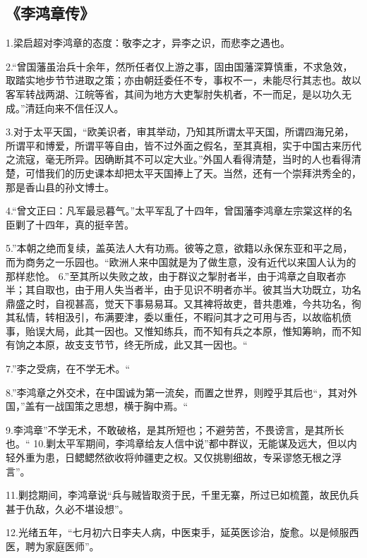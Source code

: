 \subsection{《李鸿章传》}

1.梁启超对李鸿章的态度：敬李之才，异李之识，而悲李之遇也。

2.“曾国藩虽治兵十余年，然所任者仅上游之事，固由国藩深算慎重，不求急效，取踏实地步节节进取之策；亦由朝廷委任不专，事权不一，未能尽行其志也。故以客军转战两湖、江皖等省，其间为地方大吏掣肘失机者，不一而足，是以功久无成。”清廷向来不信任汉人。

3.对于太平天国，“欧美识者，审其举动，乃知其所谓太平天国，所谓四海兄弟，所谓平和博爱，所谓平等自由，皆不过外面之假名，至其真相，实于中国古来历代之流寇，毫无所异。因确断其不可以定大业。”外国人看得清楚，当时的人也看得清楚，可惜我们的历史课本却把太平天国捧上了天。当然，还有一个崇拜洪秀全的，那是香山县的孙文博士。

4.“曾文正曰：凡军最忌暮气。”太平军乱了十四年，曾国藩李鸿章左宗棠这样的名臣剿了十四年，真的挺辛苦。

5.”本朝之绝而复续，盖英法人大有功焉。彼等之意，欲籍以永保东亚和平之局，而为商务之一乐园也。“欧洲人来中国就是为了做生意，没有近代以来国人认为的那样悲怆。
6.”至其所以失败之故，由于群议之掣肘者半，由于鸿章之自取者亦半；其自取也，由于用人失当者半，由于见识不明者亦半。彼其当大功既立，功名鼎盛之时，自视甚高，觉天下事易易耳。又其裨将故吏，昔共患难，今共功名，徇其私情，转相汲引，布满要津，委以重任，不暇问其才之可用与否，以故临机偾事，贻误大局，此其一因也。又惟知练兵，而不知有兵之本原，惟知筹晌，而不知有饷之本原，故支支节节，终无所成，此又其一因也。“

7.”李之受病，在不学无术。“

8.”李鸿章之外交术，在中国诚为第一流矣，而置之世界，则瞠乎其后也“，其对外国，”盖有一战国策之思想，横于胸中焉。“

9.李鸿章”不学无术，不敢破格，是其所短也；不避劳苦，不畏谤言，是其所长也。“
10.剿太平军期间，李鸿章给友人信中说”都中群议，无能谋及远大，但以内轻外重为患，日鳃鳃然欲收将帅疆吏之权。又仅挑剔细故，专采谬悠无根之浮言”。

11.剿捻期间，李鸿章说“兵与贼皆取资于民，千里无寨，所过已如梳蓖，故民仇兵甚于仇敌，久必不堪设想”。

12.光绪五年，“七月初六日李夫人病，中医束手，延英医诊治，旋愈。以是倾服西医，聘为家庭医师”。

